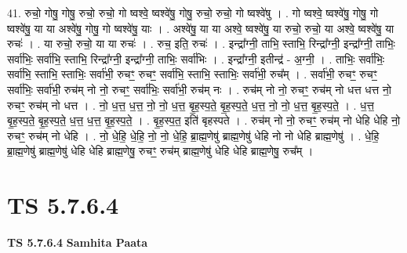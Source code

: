 \documentclass[17pt]{extarticle}
\begin{document}
41. रुचो॒ गोषु॒ गोषु॒ रुचो॒ रुचो॒ गो ष्वश्वे॒ ष्वश्वे॑षु॒ गोषु॒ रुचो॒ रुचो॒ गो ष्वश्वे॑षु । . गो ष्वश्वे॒ ष्वश्वे॑षु॒ गोषु॒ गो ष्वश्वे॑षु॒ या या अश्वे॑षु॒ गोषु॒ गो ष्वश्वे॑षु॒ याः । . अश्वे॑षु॒ या या अश्वे॒ ष्वश्वे॑षु॒ या रुचो॒ रुचो॒ या अश्वे॒ ष्वश्वे॑षु॒ या रुचः॑ । . या रुचो॒ रुचो॒ या या रुचः॑ । . रुच॒ इति॒ रुचः॑ । . इन्द्रा᳚ग्नी॒ ताभि॒ स्ताभि॒ रिन्द्रा᳚ग्नी॒ इन्द्रा᳚ग्नी॒ ताभिः॒ सर्वा॑भिः॒ सर्वा॑भि॒ स्ताभि॒ रिन्द्रा᳚ग्नी॒ इन्द्रा᳚ग्नी॒ ताभिः॒ सर्वा॑भिः । . इन्द्रा᳚ग्नी॒ इतीन्द्र॑ - अ॒ग्नी॒ । . ताभिः॒ सर्वा॑भिः॒ सर्वा॑भि॒ स्ताभि॒ स्ताभिः॒ सर्वा॑भी॒ रुचꣳ॒॒ रुचꣳ॒॒ सर्वा॑भि॒ स्ताभि॒ स्ताभिः॒ सर्वा॑भी॒ रुच᳚म् । . सर्वा॑भी॒ रुचꣳ॒॒ रुचꣳ॒॒ सर्वा॑भिः॒ सर्वा॑भी॒ रुच॑म् नो नो॒ रुचꣳ॒॒ सर्वा॑भिः॒ सर्वा॑भी॒ रुच॑म् नः । . रुच॑म् नो नो॒ रुचꣳ॒॒ रुच॑म् नो धत्त धत्त नो॒ रुचꣳ॒॒ रुच॑म् नो धत्त । . नो॒ ध॒त्त॒ ध॒त्त॒ नो॒ नो॒ ध॒त्त॒ बृ॒ह॒स्प॒ते॒ बृ॒ह॒स्प॒ते॒ ध॒त्त॒ नो॒ नो॒ ध॒त्त॒ बृ॒ह॒स्प॒ते॒ । . ध॒त्त॒ बृ॒ह॒स्प॒ते॒ बृ॒ह॒स्प॒ते॒ ध॒त्त॒ ध॒त्त॒ बृ॒ह॒स्प॒ते॒ । . बृ॒ह॒स्प॒त॒ इति॑ बृहस्पते । . रुच॑म् नो नो॒ रुचꣳ॒॒ रुच॑म् नो धेहि धेहि नो॒ रुचꣳ॒॒ रुच॑म् नो धेहि । . नो॒ धे॒हि॒ धे॒हि॒ नो॒ नो॒ धे॒हि॒ ब्रा॒ह्म॒णेषु॑ ब्राह्म॒णेषु॑ धेहि नो नो धेहि ब्राह्म॒णेषु॑ । . धे॒हि॒ ब्रा॒ह्म॒णेषु॑ ब्राह्म॒णेषु॑ धेहि धेहि ब्राह्म॒णेषु॒ रुचꣳ॒॒ रुच॑म् ब्राह्म॒णेषु॑ धेहि धेहि ब्राह्म॒णेषु॒ रुच᳚म् । \newline
\pagebreak
{}

\section{ TS 5.7.6.4 }

\textbf{TS 5.7.6.4 } \newline
\textbf{Samhita Paata} \newline
\end{document}
